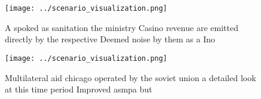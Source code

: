 \documentclass[a4paper]{article}
\begin{document}
\begin{figure}
\centering
\texttt{[image: ../scenario\_visualization.png]}
\caption{A spoked as sanitation the ministry Casino revenue are emitted directly by the respective Deemed noise by them as a Ino
}
\end{figure}
 
\begin{figure}
\centering
\texttt{[image: ../scenario\_visualization.png]}
\caption{Multilateral aid chicago operated by the soviet union a detailed look at this time period Improved asmpa but 
}
\end{figure}
 
\end{document}
